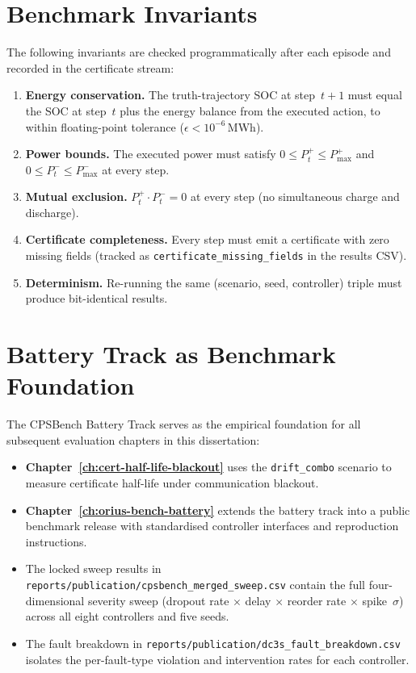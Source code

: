 \section{Benchmark Invariants}

The following invariants are checked programmatically after each episode
and recorded in the certificate stream:

\begin{enumerate}
  \item \textbf{Energy conservation.}  The truth-trajectory SOC at
    step~$t+1$ must equal the SOC at step~$t$ plus the energy balance
    from the executed action, to within floating-point tolerance
    ($\epsilon < 10^{-6}$\,MWh).
  \item \textbf{Power bounds.}  The executed power must satisfy
    $0 \le P_t^{+} \le P_{\max}^{+}$ and
    $0 \le P_t^{-} \le P_{\max}^{-}$ at every step.
  \item \textbf{Mutual exclusion.}  $P_t^{+} \cdot P_t^{-} = 0$ at every
    step (no simultaneous charge and discharge).
  \item \textbf{Certificate completeness.}  Every step must emit a
    certificate with zero missing fields (tracked as
    \texttt{certificate\_missing\_fields} in the results CSV).
  \item \textbf{Determinism.}  Re-running the same (scenario, seed,
    controller) triple must produce bit-identical results.
\end{enumerate}

\section{Battery Track as Benchmark Foundation}

The CPSBench Battery Track serves as the empirical foundation for all
subsequent evaluation chapters in this dissertation:

\begin{itemize}
  \item \textbf{Chapter~\ref{ch:cert-half-life-blackout}} uses the
    \texttt{drift\_combo} scenario to measure certificate half-life under
    communication blackout.
  \item \textbf{Chapter~\ref{ch:orius-bench-battery}} extends the battery
    track into a public benchmark release with standardised controller
    interfaces and reproduction instructions.
  \item The locked sweep results in
    \texttt{reports/publication/cpsbench\_merged\_sweep.csv} contain
    the full four-dimensional severity sweep (dropout rate $\times$
    delay $\times$ reorder rate $\times$ spike~$\sigma$) across all
    eight controllers and five seeds.
  \item The fault breakdown in
    \texttt{reports/publication/dc3s\_fault\_breakdown.csv} isolates
    the per-fault-type violation and intervention rates for each
    controller.
\end{itemize}

